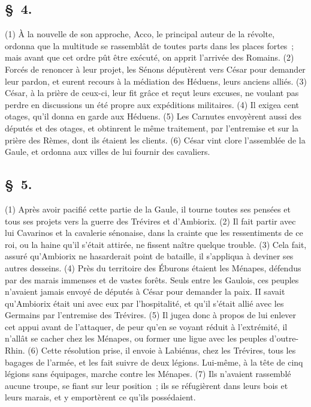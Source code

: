 \documentclass[french,twoside]{book} %
\begin{document}
\subsection[{§ 4.}]{ \textsc{§ 4.} }
\noindent (1) À la nouvelle de son approche, Acco, le principal auteur de la révolte, ordonna que la multitude se rassemblât de toutes parts dans les places fortes ; mais avant que cet ordre pût être exécuté, on apprit l’arrivée des Romains. (2) Forcés de renoncer à leur projet, les Sénons députèrent vers César pour demander leur pardon, et eurent recours à la médiation des Héduens, leurs anciens alliés. (3) César, à la prière de ceux-ci, leur fit grâce et reçut leurs excuses, ne voulant pas perdre en discussions un été propre aux expéditions militaires. (4) Il exigea cent otages, qu’il donna en garde aux Héduens. (5) Les Carnutes envoyèrent aussi des députés et des otages, et obtinrent le même traitement, par l’entremise et sur la prière des Rèmes, dont ils étaient les clients. (6) César vint clore l’assemblée de la Gaule, et ordonna aux villes de lui fournir des cavaliers.
\subsection[{§ 5.}]{ \textsc{§ 5.} }
\noindent (1) Après avoir pacifié cette partie de la Gaule, il tourne toutes ses pensées et tous ses projets vers la guerre des Trévires et d’Ambiorix. (2) Il fait partir avec lui Cavarinos et la cavalerie sénonaise, dans la crainte que les ressentiments de ce roi, ou la haine qu’il s’était attirée, ne fissent naître quelque trouble. (3) Cela fait, assuré qu’Ambiorix ne hasarderait point de bataille, il s’appliqua à deviner ses autres desseins. (4) Près du territoire des Éburons étaient les Ménapes, défendus par des marais immenses et de vastes forêts. Seuls entre les Gaulois, ces peuples n’avaient jamais envoyé de députés à César pour demander la paix. II savait qu’Ambiorix était uni avec eux par l’hospitalité, et qu’il s’était allié avec les Germains par l’entremise des Trévires. (5) Il jugea donc à propos de lui enlever cet appui avant de l’attaquer, de peur qu’en se voyant réduit à l’extrémité, il n’allât se cacher chez les Ménapes, ou former une ligue avec les peuples d’outre-Rhin. (6) Cette résolution prise, il envoie à Labiénus, chez les Trévires, tous les bagages de l’armée, et les fait suivre de deux légions. Lui-même, à la tête de cinq légions sans équipages, marche contre les Ménapes. (7) Ils n’avaient rassemblé aucune troupe, se fiant sur leur position ; ils se réfugièrent dans leurs bois et leurs marais, et y emportèrent ce qu’ils possédaient.
\end{document}
